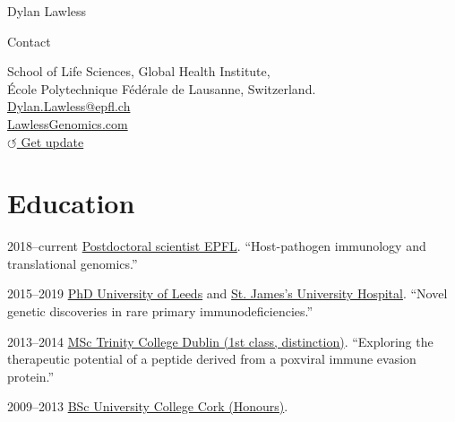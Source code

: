 \documentclass[11pt,a4paper]{article}
\begin{document}
\begin{cv}{Dylan Lawless} 
  \begin{cvlist}{Contact}
  \item School of Life Sciences, Global Health Institute, \\
    \'Ecole Polytechnique F\'ed\'erale de Lausanne,
    Switzerland. \\
    \href{mailto:Dylan.Lawless@epfl.ch}{Dylan.Lawless@epfl.ch}\\
    \href{https://lawlessgenomics.com}{LawlessGenomics.com}\\
    \href{https://lawlessgenomics.com/resume/pdf/Dylan_Lawless.pdf}{$\circlearrowleft$ Get update}
\end{cvlist}

\section*{Education}
\begin{cvlist}{}
  \item[2018--current] \href{https://fellay-lab.epfl.ch}{Postdoctoral scientist EPFL}. ``Host-pathogen immunology and translational genomics.''
  \item[2015--2019] \href{https://medicinehealth.leeds.ac.uk/medicine}{PhD University of Leeds} and \href{https://medicinehealth.leeds.ac.uk/homepage/160/leeds_institute_of_medical_research_at_st_jamess}{St. James's University Hospital}. ``Novel genetic discoveries in rare primary immunodeficiencies.''
  \item[2013--2014] \href{https://www.tcd.ie/biosciences/}{MSc Trinity College Dublin (1st class, distinction)}. ``Exploring the therapeutic potential of a peptide derived from a poxviral immune evasion protein.''
  \item[2009--2013] \href{https://www.ucc.ie/en/}{BSc University College Cork (Honours)}.
  \end{cvlist}


\end{cv}
\end{document}
